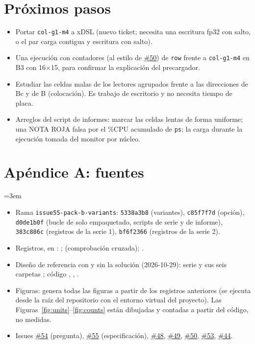 \documentclass[10pt,a4paper]{article}
\newcommand{\iss}[1]{\href{https://github.com/JieGH/RVV_code_gen_via_MLIR_xDSL/issues/#1}{\##1}}
\begin{document}
\section{Próximos pasos}
\begin{itemize}
  \item Portar \texttt{col-g1-m4} a xDSL (nuevo ticket; necesita una escritura fp32 con salto, o el par carga contigua y escritura con
  salto).
  \item Una ejecución con contadores (al estilo de \iss{50}) de \texttt{row} frente a \texttt{col-g1-m4} en B3 con 16$\times$15, para
  confirmar la explicación del precargador.
  \item Estudiar las celdas malas de los lectores agrupados frente a las direcciones de Bc y de B (colocación). Es trabajo de
  escritorio y no necesita tiempo de placa.
  \item Arreglos del script de informes: marcar las celdas lentas de forma uniforme; una NOTA ROJA falsa por el \%CPU acumulado de
  \texttt{ps}; la carga durante la ejecución tomada del monitor por núcleo.
\end{itemize}

\section*{Apéndice A: fuentes}
\raggedright\emergencystretch=3em
\begin{itemize}
  \item Rama \texttt{issue55-pack-b-variants}: \texttt{5338a3b8} (variantes), \texttt{c85f7f7d} (opción), \texttt{d0de1b0f} (bucle de
  solo empaquetado, scripts de serie y de informe), \texttt{383c886c} (registros de la serie 1), \texttt{bf6f2366} (registros de la
  serie 2).
  \item Registros, en : ;
   (comprobación cruzada);
  .
  \item Diseño de referencia con y sin la solución (2026-10-29): serie  y sus seis carpetas
  ; código , ,
  .
  \item Figuras:  genera todas las figuras a partir de los registros anteriores (se
  ejecuta desde la raíz del repositorio con el entorno virtual del proyecto). Las Figuras~\ref{fig:units}--\ref{fig:counts} están
  dibujadas y contadas a partir del código, no medidas.
  \item Issues \iss{54} (pregunta), \iss{55} (especificación), \iss{48}, \iss{49}, \iss{50}, \iss{53}, \iss{44}.
\end{itemize}
\end{document}
